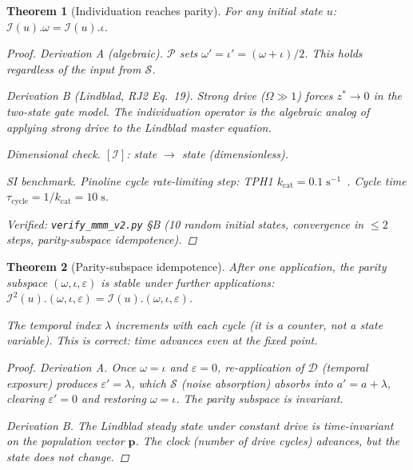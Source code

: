 \documentclass[12pt,oneside]{article}
\theoremstyle{principia}
\newtheorem{theorem}{Theorem}[section]
\theoremstyle{definition}
\theoremstyle{remark}
\begin{document}
\begin{theorem}[Individuation reaches parity]
\label{thm:ind_parity}
For any initial state $u$:
$\mathcal{I}(u).\omega = \mathcal{I}(u).\iota$.

\begin{proof}
\emph{Derivation A (algebraic).}
$\mathcal{P}$ sets $\omega' = \iota' = (\omega+\iota)/2$.
This holds regardless of the input from $\mathcal{S}$.

\emph{Derivation B (Lindblad, RJ2 Eq.~19).}
Strong drive ($\Omega \gg 1$) forces $z^* \to 0$ in the two-state
gate model. The individuation operator is the algebraic analog of
applying strong drive to the Lindblad master equation.

\emph{Dimensional check.}
$[\mathcal{I}]$: state $\to$ state (dimensionless). \checkmark

\emph{SI benchmark.}
Pinoline cycle rate-limiting step: TPH1 $k_\mathrm{cat} = 0.1\;\mathrm{s^{-1}}$~\cite{mckinney05}.
Cycle time $\tau_\mathrm{cycle} = 1/k_\mathrm{cat} = 10\;\mathrm{s}$.

Verified: \texttt{verify\_mmm\_v2.py} \S B (10 random initial states,
convergence in $\leq 2$ steps, parity-subspace idempotence).
\qedhere
\end{proof}
\end{theorem}

\begin{theorem}[Parity-subspace idempotence]
\label{thm:idempotent}
After one application, the parity subspace $(\omega, \iota, \varepsilon)$
is stable under further applications:
$\mathcal{I}^2(u).(\omega,\iota,\varepsilon) = \mathcal{I}(u).(\omega,\iota,\varepsilon)$.

The temporal index $\lambda$ increments with each cycle (it is a counter,
not a state variable). This is correct: time advances even at the fixed point.

\begin{proof}
\emph{Derivation A.} Once $\omega = \iota$ and $\varepsilon = 0$,
re-application of $\mathcal{D}$ (temporal exposure) produces
$\varepsilon' = \lambda$, which $\mathcal{S}$ (noise absorption)
absorbs into $a' = a + \lambda$, clearing $\varepsilon' = 0$ and
restoring $\omega = \iota$. The parity subspace is invariant.

\emph{Derivation B.}
The Lindblad steady state under constant drive is time-invariant
on the population vector $\mathbf{p}$. The clock (number of drive
cycles) advances, but the state does not change.
\qedhere
\end{proof}
\end{theorem}
\end{document}
